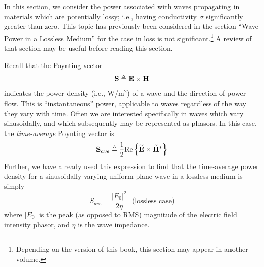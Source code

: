 

\label{m0133_Wave_Power_in_a_Lossy_Medium} %

In this section, we consider the power associated with waves propagating in materials which are potentially lossy; i.e., having conductivity $\sigma$ significantly greater than zero.
This topic has previously been considered in the section ``Wave Power in a Lossless Medium'' for the case in loss is not significant.\footnote{Depending on the version of this book, this section may appear in another volume.}
A review of that section may be useful before reading this section.

Recall that the Poynting vector
%
\begin{equation}
{\bf S} \triangleq {\bf E} \times {\bf H} 
\end{equation}
%
indicates the power density (i.e., W/m$^2$) of a wave and the direction of power flow.
This is ``instantaneous'' power, applicable to waves regardless of the way they vary with time.
Often we are interested specifically in waves which vary sinusoidally, and which subsequently may be represented as phasors.  In this case, the \emph{time-average} Poynting vector is 
%
\begin{equation}
{\bf S}_{ave} \triangleq \frac{1}{2} \mbox{Re} \left\{ \widetilde{\bf E} \times \widetilde{\bf H}^* \right\}
\label{m0133_ePVP}
\end{equation}
%
Further, we have already used this expression to find that the time-average power density for a sinusoidally-varying uniform plane wave in a lossless medium is simply
%
\begin{equation}
S_{ave} = \frac{\left|E_0\right|^2}{2\eta} ~~~ \mbox{(lossless case)}
\label{m0133_ePaveL}
\end{equation}
%
where $\left|E_0\right|$ is the peak (as opposed to RMS) magnitude of the electric field intensity phasor, and $\eta$ is the wave impedance.

